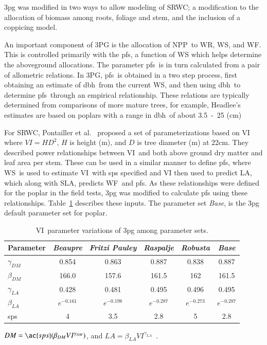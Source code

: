 \documentclass[preprint,review,12pt]{elsarticle}
\begin{document}
\ac{3pg} was modified in two ways to allow modeling of \ac{SRWC}; a
modification to the allocation of biomass among roots, foliage and
stem, and the inclusion of a coppicing model.

An important component of 3PG is the allocation of \ac{NPP}~to
\ac{WR}, \ac{WS}, and \ac{WF}.  This is controlled primarily with the
\ac{pfs}, a function of \ac{WS} which helps determine the aboveground
allocations.  The parameter \ac{pfs}~is in turn calculated from a pair of allometric
relations.  In 3PG, \ac{pfs}~is obtained in a two step process, first
obtaining an estimate of \ac{dbh}~from the current \ac{WS}, and then
using \ac{dbh}~to determine \ac{pfs}~through an empirical
relationship.  These relations are typically determined from
comparisons of more mature trees, for example, Headlee's estimates are
based on poplars with a range in \ac{dbh}~of about 3.5~-~25
(cm)~\cite{Headlee2012}%

For \ac{SRWC}, Pontailler et al.~\cite{pontailler97-volume-index}
proposed a set of parameterizations based on \ac{VI} where $VI =
HD^2$, $H$ is height (m), and $D$ is tree diameter (m) at 22cm.  They
described power relationships between \ac{VI}~and both above ground
dry matter and leaf area per stem. These can be used in a similar
manner to define \ac{pfs}, where \ac{WS}~is used to estimate
\ac{VI}~with \ac{sps} specified and \ac{VI} then used to predict
\ac{LA}, which along with \ac{SLA}, predicts \ac{WF}~and \ac{pfs}. As
these relationships were defined for the poplar in the field tests,
\ac{3pg} was modified to calculate \ac{pfs} using these relationships.
Table~\ref{tab:pont-3pg} describes these inputs.  The parameter set
\emph{Base}, is the \ac{3pg} default parameter set for poplar.

\begin{table}%
  \caption{\acf{VI}~parameter variations of \ac{3pg} among parameter sets.}
  \begin{tabular}{|lccccc|}
    \hline
    Parameter & \emph{Beaupre} & \emph{Fritzi Pauley} & \emph{Raspalje} & \emph{Robusta} & \emph{Base}\\
    \hline
    $\gamma_{DM}$ &  0.854 & 0.863 & 0.887 & 0.838 & 0.887\\
    $\beta_{DM}$  & 166.0 & 157.6 & 161.5 & 162 & 161.5\\
    $\gamma_{LA}$ &  0.428 &  0.481 & 0.495 & 0.496 & 0.495\\ 
    $\beta_{LA}$ & $e^{-0.161}$ & $e^{-0.198}$ & $e^{-0.287}$ & $e^{-0.273}$ & $e^{-0.287}$\\
    \ac{sps} & 4 & 3.5 & 2.8 & 5 & 2.8\\
    \hline 
  \end{tabular}
  \begin{flushleft}$DM=\ac{sps}(\beta_{DM} VI^{\gamma_{DM}})$, and $LA = \beta_{LA} VI^{\gamma_{LA}}$~\cite{pontailler97-volume-index}.
\end{flushleft}  
\label{tab:pont-3pg}
\end{table}
\end{document}
